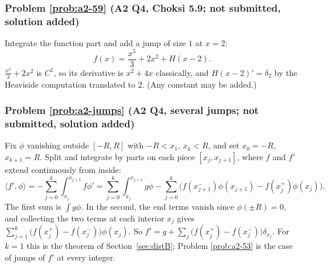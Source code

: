 \documentclass{article}
\newcommand{\ip}[2]{\langle #1, #2 \rangle}
\begin{document}
\label{sol:a2-59}
\subsubsection*{Problem \ref{prob:a2-59} (A2 Q4, Choksi 5.9; not submitted, solution added)}
Integrate the function part and add a jump of size $1$ at $x = 2$:
\begin{equation*}
    f(x) = \frac{x^3}{3} + 2x^2 + H(x - 2).
\end{equation*}
$\frac{x^3}{3} + 2x^2$ is $C^1$, so its derivative is $x^2 + 4x$ classically, and $H(x-2)' = \delta_2$ by the Heaviside computation translated to $2$. (Any constant may be added.)

\label{sol:a2-jumps}
\subsubsection*{Problem \ref{prob:a2-jumps} (A2 Q4, several jumps; not submitted, solution added)}
Fix $\phi$ vanishing outside $[-R,R]$ with $-R < x_1$, $x_k < R$, and set $x_0 = -R$, $x_{k+1} = R$. Split and integrate by parts on each piece $[x_j, x_{j+1}]$, where $f$ and $f'$ extend continuously from inside:
\begin{equation*}
    \ip{f'}{\phi} = -\sum_{j=0}^k\int_{x_j}^{x_{j+1}}f\phi' = \sum_{j=0}^k\int_{x_j}^{x_{j+1}}g\phi - \sum_{j=0}^k\Big(f(x_{j+1}^-)\phi(x_{j+1}) - f(x_j^+)\phi(x_j)\Big).
\end{equation*}
The first sum is $\int g\phi$. In the second, the end terms vanish since $\phi(\pm R) = 0$, and collecting the two terms at each interior $x_j$ gives $\sum_{j=1}^k\big(f(x_j^+) - f(x_j^-)\big)\phi(x_j)$. So $f' = g + \sum_j\big(f(x_j^+) - f(x_j^-)\big)\delta_{x_j}$. For $k = 1$ this is the theorem of Section~\ref{sec:distB}; Problem \ref{prob:a2-53} is the case of jumps of $f'$ at every integer.

\label{sol:a2-511}
\end{document}
